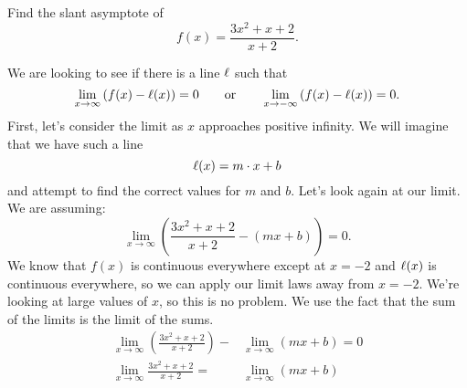 \documentclass{ximera}
\begin{document}
\begin{example}
  Find the slant asymptote of
  \[
f(x) = \frac{3x^2+x+2}{x+2}.
  \]
  \begin{explanation}
    We are looking to see if there is a line $\ell$ such that
    \[
    \lim_{x\to \infty}\left(f(x) - \l(x)\right) = 0\qquad\text{or}\qquad \lim_{x\to -\infty} \left( f(x) - \l(x)\right) = 0.
    \]
    First, let's consider the limit as $x$ approaches positive infinity.  We will imagine that we have such a line
    \[
    \ell(x) = m\cdot x + b
    \]
    and attempt to find the correct values for $m$ and $b$.  Let's look again at our limit.  We are assuming:
\[
    \lim_{x \to \infty} \left (\frac{3x^2 + x + 2}{x+2} - (mx + b) \right) = 0.
\]
    We know that $f(x)$ is continuous everywhere except at $x = -2$ and $\ell(x)$ is continuous everywhere, so 
    we can apply our limit laws away from $x = -2$.  We're looking at large values of $x$, so this is no problem.  We use the fact that the sum of the limits is the limit of the sums.
    \begin{align*}
    \lim_{x \to \infty} \left ( \frac{3x^2 + x + 2}{x+2} \right ) - &\lim_{x\to\infty} (mx+b) = 0 \\
    \lim_{x \to \infty} \frac{3x^2 + x + 2}{x+2} = &\lim_{x \to \infty} (mx+b)
    \end{align*}
    

\end{explanation}
\end{example}
\end{document}
